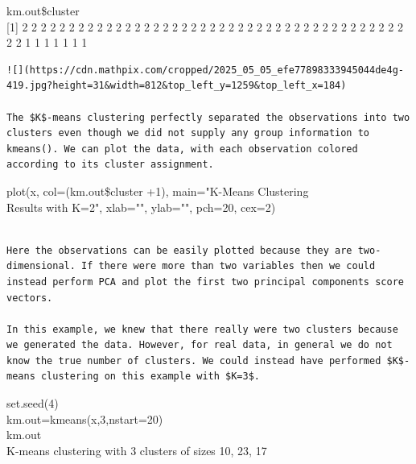 \documentclass[10pt]{article}
\begin{document}
\begin{displayquote}
km.out\$cluster\\[0pt]
[1] 2 2 2 2 2 2 2 2 2 2 2 2 2 2 2 2 2 2 2 2 2 2 2 2 2 2 2 2 2 2 2 2 2 2 2 2 2 2 2 2 2 2 2 1 1 1 1 1 1 1
\end{displayquote}

\begin{verbatim}
![](https://cdn.mathpix.com/cropped/2025_05_05_efe77898333945044de4g-419.jpg?height=31&width=812&top_left_y=1259&top_left_x=184)

The $K$-means clustering perfectly separated the observations into two clusters even though we did not supply any group information to kmeans(). We can plot the data, with each observation colored according to its cluster assignment.
\end{verbatim}

\begin{displayquote}
plot(x, col=(km.out\$cluster +1), main="K-Means Clustering\\
Results with K=2", xlab="", ylab="", pch=20, cex=2)
\end{displayquote}

\begin{verbatim}

Here the observations can be easily plotted because they are two-dimensional. If there were more than two variables then we could instead perform PCA and plot the first two principal components score vectors.

In this example, we knew that there really were two clusters because we generated the data. However, for real data, in general we do not know the true number of clusters. We could instead have performed $K$-means clustering on this example with $K=3$.
\end{verbatim}

\begin{displayquote}
set.seed(4)\\
km.out=kmeans(x,3,nstart=20)\\
km.out\\
K-means clustering with 3 clusters of sizes 10, 23, 17
\end{displayquote}

\begin{verbatim}

\end{verbatim}
\end{document}

